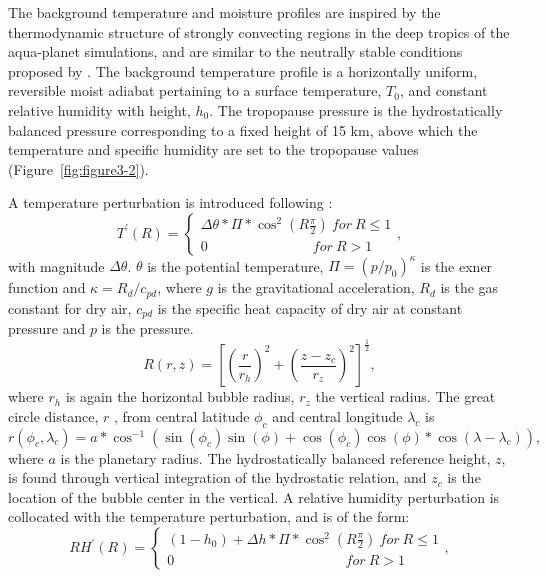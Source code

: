 The background temperature and moisture profiles are inspired by the thermodynamic structure of strongly convecting regions in the deep tropics of the aqua-planet simulations, and are similar to the neutrally stable conditions proposed by \cite{BETAL2002MWR}. The background temperature profile is a horizontally uniform, reversible moist adiabat pertaining to a surface temperature, $T_0$, and constant relative humidity with height, $h_0$. The tropopause pressure is the hydrostatically balanced pressure corresponding to a fixed height of 15 km, above which the temperature and specific humidity are set to the tropopause values (Figure~\ref{fig:figure3-2}).

A temperature perturbation is introduced following \cite{KETAL2015JAMES}:
\begin{equation}
T^{\prime} (R) = \begin{cases} \Delta \theta * \Pi * \cos^2 (R \frac{\pi}{2}) \: for \: R \leq 1 \\
						0 \; \; \; \; \; \; \; \; \; \; \; \; \; \; \; \; \; \; \; \; \; \; \; \; \; \; \; for \:R > 1 \end{cases}, \label{eq:eq3-4}
\end{equation}
with magnitude $\Delta \theta$. $\theta$ is the potential temperature, $\Pi = (p/p_0)^{\kappa}$ is the exner function and $\kappa = R_d/c_{pd}$, where $g$ is the gravitational acceleration, $R_d$ is the gas constant for dry air, $c_{pd}$ is the specific heat capacity of dry air at constant pressure and $p$ is the pressure. 
\begin{equation}
R(r,z) = \left[ \left( \frac{r}{r_h} \right)^2 + \left( \frac{z-z_c}{r_z} \right)^2 \right]^{\frac{1}{2}}, \label{eq:eq3-5}
\end{equation}
where $r_h$ is again the horizontal bubble radius, $r_z$ the vertical radius. The great circle distance, $r$ , from central latitude $\phi_c$ and central longitude  $\lambda_c$ is
\begin{equation}
r(\phi_c, \lambda_c) = a * \cos^{-1} \left( \sin(\phi_c) \sin(\phi) + \cos(\phi_c) \cos(\phi) * \cos(\lambda - \lambda_c) \right), \label{eq:eq3-6}
\end{equation}
where $a$ is the planetary radius. The hydrostatically balanced reference height, $z$, is found through vertical integration of the hydrostatic relation, and $z_c$ is the location of the bubble center in the vertical. A relative humidity perturbation is collocated with the temperature perturbation, and is of the form:
\begin{equation}
RH^{\prime} (R) = \begin{cases} \left( 1 - h_0 \right) + \Delta h * \Pi * \cos^2 (R \frac{\pi}{2}) \: for \: R \leq 1 \\
						0 \; \; \; \; \; \; \; \; \; \; \; \; \; \; \; \; \; \; \; \; \; \; \; \; \; \; \; \; \; \; \; \; \; \; \; \; \; \; \; \; \; \; \; \; for \:R > 1 \end{cases}, \label{eq:eq3-7}
\end{equation}
